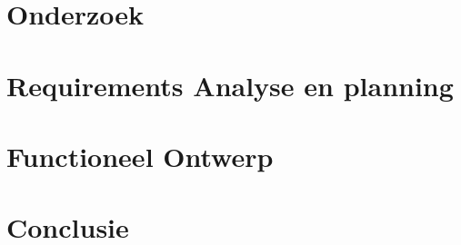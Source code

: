 \ctparttext{}
\part{Onderzoek}\label{prt:Onderzoek} %








\ctparttext{}
\part{Requirements Analyse en planning}\label{prt:Requirements}





\ctparttext{}
\part{Functioneel Ontwerp}\label{prt:Functioneel Ontwerp}








 \ctparttext{}

 \part{Conclusie}\label{prt:Conclussie}
 
 

\cleardoublepage %


\ctparttext{}


\cleardoublepage %


